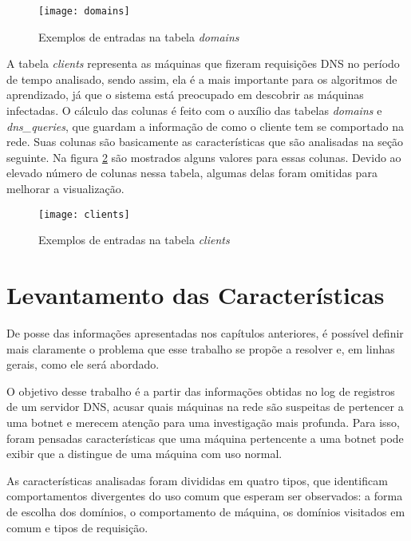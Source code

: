 \begin{figure}
\texttt{[image: domains]}
\caption[Exemplos de entradas na tabela \textit{domains}]{Exemplos de entradas na tabela \textit{domains}} \label{fig:domains}
\end{figure}

A tabela \textit{clients} representa as máquinas que fizeram requisições DNS no período de tempo analisado, sendo assim, ela é a mais importante para os algoritmos de aprendizado, já que o sistema está preocupado em descobrir as máquinas infectadas. O cálculo das colunas é feito com o auxílio das tabelas \textit{domains} e \textit{dns\_queries}, que guardam a informação de como o cliente tem se comportado na rede. Suas colunas são basicamente as características que são analisadas na seção seguinte. Na figura \ref{fig:clients} são mostrados alguns valores para essas colunas. Devido ao elevado número de colunas nessa tabela, algumas delas foram omitidas para melhorar a visualização.

\begin{figure}
\texttt{[image: clients]}
\caption[Exemplos de entradas na tabela \textit{clients}]{Exemplos de entradas na tabela \textit{clients}} \label{fig:clients}
\end{figure}

\section{Levantamento das Características}
\label{sec:levantamento_das_caracteristicas}
De posse das informações apresentadas nos capítulos anteriores, é possível definir mais claramente o problema que esse trabalho se propõe a resolver e, em linhas gerais, como ele será abordado.

O objetivo desse trabalho é a partir das informações obtidas no log de registros de um servidor DNS, acusar quais máquinas na rede são suspeitas de pertencer a uma botnet e merecem atenção para uma investigação mais profunda. Para isso, foram pensadas características que uma máquina pertencente a uma botnet pode exibir que a distingue de uma máquina com uso normal.

As características analisadas foram divididas em quatro tipos, que identificam comportamentos divergentes do uso comum que esperam ser observados: a forma de escolha dos domínios, o comportamento de máquina, os domínios visitados em comum e tipos de requisição.

